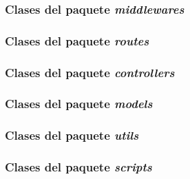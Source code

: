 \subsubsection{Clases del paquete \textit{middlewares}}
\subsubsection{Clases del paquete \textit{routes}}
\subsubsection{Clases del paquete \textit{controllers}}
\subsubsection{Clases del paquete \textit{models}}
\subsubsection{Clases del paquete \textit{utils}}
\subsubsection{Clases del paquete \textit{scripts}}

